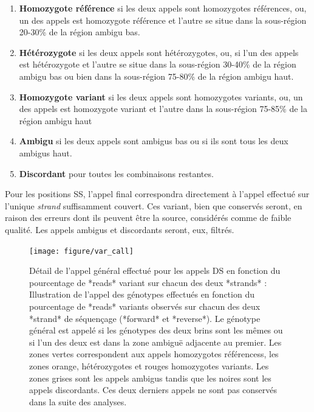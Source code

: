 \documentclass[12pt,twoside]{reedthesis}
\providecommand{\tightlist}{%
  \setlength{\itemsep}{0pt}\setlength{\parskip}{0pt}}
\theoremstyle{definition}
\theoremstyle{definition}
\theoremstyle{remark}
\begin{document}
  \begin{enumerate}
  \def\labelenumi{\arabic{enumi}.}
  \tightlist
  \item
    \textbf{Homozygote référence} si les deux appels sont homozygotes
    références, ou, un des appels est homozygote référence et l'autre se
    situe dans la sous-région 20-30\% de la région ambigu bas.\\
  \item
    \textbf{Hétérozygote} si les deux appels sont hétérozygotes, ou, si
    l'un des appels est hétérozygote et l'autre se situe dans la
    sous-région 30-40\% de la région ambigu bas ou bien dans la
    sous-région 75-80\% de la région ambigu haut.\\
  \item
    \textbf{Homozygote variant} si les deux appels sont homozygotes
    variants, ou, un des appels est homozygote variant et l'autre dans la
    sous-région 75-85\% de la région ambigu haut
  \item
    \textbf{Ambigu} si les deux appels sont ambigus bas ou si ils sont
    tous les deux ambigus haut.\\
  \item
    \textbf{Discordant} pour toutes les combinaisons restantes.
  \end{enumerate}
  
  Pour les positions SS, l'appel final correspondra directement à l'appel
  effectué sur l'unique \emph{strand} suffisamment couvert. Ces variant,
  bien que conservés seront, en raison des erreurs dont ils peuvent être
  la source, considérés comme de faible qualité. Les appels ambigus et
  discordants seront, eux, filtrés.
  
  \newpage
  
  \begin{figure}
  
  {\centering \texttt{[image: figure/var\_call]} 
  
  }
  
  \caption[Détail de l'appel général effectué pour les appels DS en fonction du pourcentage de *reads* variant sur chacun des deux *strands*]{Détail de l'appel général effectué pour les appels DS en fonction du pourcentage de *reads* variant sur chacun des deux *strands* : Illustration de l'appel des génotypes effectués en fonction du pourcentage de *reads* variants observés sur chacun des deux *strand* de séquençage (*forward* et *reverse*). Le génotype général est appelé si les génotypes des deux brins sont les mêmes ou si l'un des deux est dans la zone ambiguë adjacente au premier. Les zones vertes correspondent aux appels homozygotes référencess, les zones orange, hétérozygotes et rouges homozygotes variants. Les zones grises sont les appels ambigus tandis que les noires sont les appels discordants. Ces deux derniers appels ne sont pas conservés dans la suite des analyses.}\label{fig:picvarcall}
  \end{figure}
  
\end{document}

